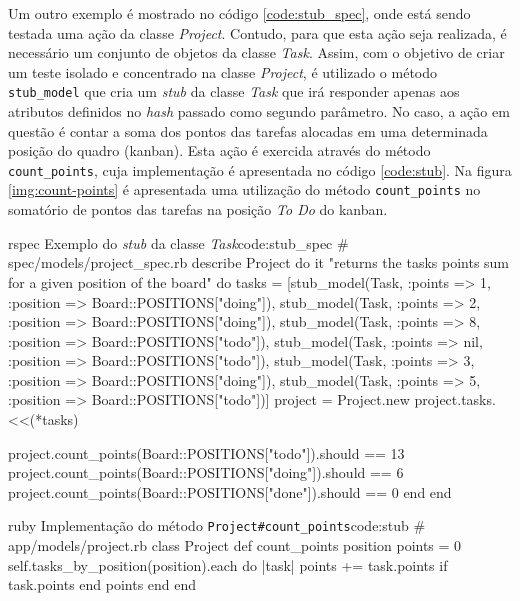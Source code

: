 Um outro exemplo é mostrado no código \ref{code:stub_spec}, onde está sendo testada uma ação da classe \textit{Project}. Contudo, para que esta ação seja realizada, é necessário um conjunto de objetos da classe \textit{Task}. Assim, com o objetivo de criar um teste isolado e concentrado na classe \textit{Project}, é utilizado o método \texttt{stub\_model} que cria um \textit{stub} da classe \textit{Task} que irá responder apenas aos atributos definidos no \textit{hash} passado como segundo parâmetro. No caso, a ação em questão é contar a soma dos pontos das tarefas alocadas em uma determinada posição do quadro (kanban). Esta ação é exercida através do método \texttt{count\_points}, cuja implementação é apresentada no código \ref{code:stub}. Na figura \ref{img:count-points} é apresentada uma utilização do método \texttt{count\_points} no somatório de pontos das tarefas na posição \textit{To Do} do kanban.

\begin{mycode}{rspec}%
{Exemplo do \textit{stub} da classe \textit{Task}}{code:stub_spec}
# spec/models/project_spec.rb
describe Project do
  it "returns the tasks points sum for a given position of the board" do
    tasks = [stub_model(Task, :points => 1, :position => Board::POSITIONS["doing"]),
             stub_model(Task, :points => 2, :position => Board::POSITIONS["doing"]),
             stub_model(Task, :points => 8, :position => Board::POSITIONS["todo"]),
             stub_model(Task, :points => nil, :position => Board::POSITIONS["todo"]),
             stub_model(Task, :points => 3, :position => Board::POSITIONS["doing"]),
             stub_model(Task, :points => 5, :position => Board::POSITIONS["todo"])]
    project = Project.new
    project.tasks.<<(*tasks)

    project.count_points(Board::POSITIONS["todo"]).should == 13
    project.count_points(Board::POSITIONS["doing"]).should == 6
    project.count_points(Board::POSITIONS["done"]).should == 0
  end
end
\end{mycode}

\begin{mycode}{ruby}%
{Implementação do método \texttt{Project\#count\_points}}{code:stub}
# app/models/project.rb
class Project
  def count_points position
    points = 0
    self.tasks_by_position(position).each do |task|
      points += task.points if task.points
    end
    points
  end
end
\end{mycode}

